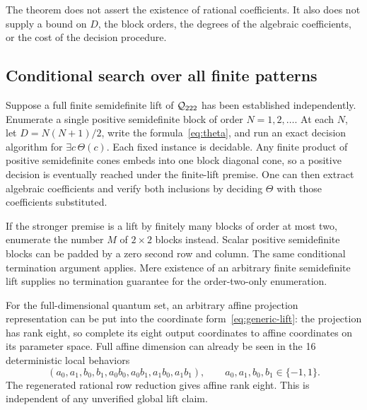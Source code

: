 The theorem does not assert the existence of rational coefficients. It also does not supply a bound on $D$, the block orders, the degrees of the algebraic coefficients, or the cost of the decision procedure.

\subsection{Conditional search over all finite patterns}
Suppose a full finite semidefinite lift of ${\mathcal Q_{222}}$ has been established independently. Enumerate a single positive semidefinite block of order $N=1,2,\ldots$. At each $N$, let $D=N(N+1)/2$, write the formula~\eqref{eq:theta}, and run an exact decision algorithm for $\exists c\,\Theta(c)$. Each fixed instance is decidable. Any finite product of positive semidefinite cones embeds into one block diagonal cone, so a positive decision is eventually reached under the finite-lift premise. One can then extract algebraic coefficients and verify both inclusions by deciding $\Theta$ with those coefficients substituted.

If the stronger premise is a lift by finitely many blocks of order at most two, enumerate the number $M$ of $2\times2$ blocks instead. Scalar positive semidefinite blocks can be padded by a zero second row and column. The same conditional termination argument applies. Mere existence of an arbitrary finite semidefinite lift supplies no termination guarantee for the order-two-only enumeration.

For the full-dimensional quantum set, an arbitrary affine projection representation can be put into the coordinate form~\eqref{eq:generic-lift}: the projection has rank eight, so complete its eight output coordinates to affine coordinates on its parameter space. Full affine dimension can already be seen in the 16 deterministic local behaviors
\[
 (a_0,a_1,b_0,b_1,a_0b_0,a_0b_1,a_1b_0,a_1b_1),
 \qquad a_0,a_1,b_0,b_1\in\{-1,1\}.
\]
The regenerated rational row reduction gives affine rank eight. This is independent of any unverified global lift claim.

